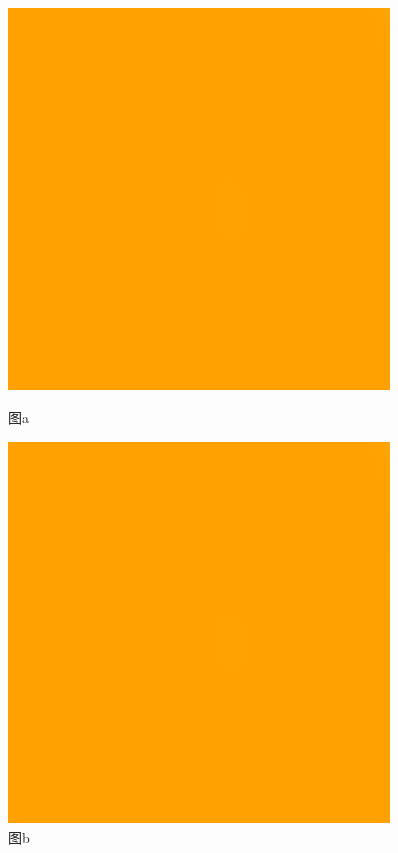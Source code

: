 \begin{figure}[h]
\begin{minipage}[t]{0.5\textwidth}
  \centering
  \includegraphics[width=0.9\textwidth]
    {pic/example.png}
  \caption{图a}\label{fig:图a}
\end{minipage}
\begin{minipage}[t]{0.5\textwidth}
  \centering
  \includegraphics[width=0.9\textwidth]
    {pic/example.png}
  \caption{图b}\label{fig:图b}
\end{minipage}
\end{figure}

